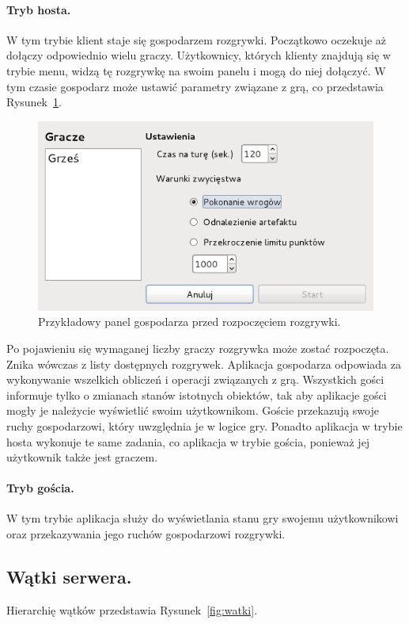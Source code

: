 \documentclass[a4paper, 12pt]{article}
\begin{document}
\paragraph{Tryb hosta.} W tym trybie klient staje się gospodarzem rozgrywki. Początkowo oczekuje aż dołączy odpowiednio wielu graczy. Użytkownicy, których klienty znajdują się w trybie menu, widzą tę rozgrywkę na swoim panelu i mogą do niej dołączyć. W tym czasie gospodarz może ustawić parametry związane z grą, co przedstawia Rysunek~\ref{fig:inicjacja}.

\begin{figure}
\centering
\includegraphics[scale=0.8]{rysunki/inicjacja.png}
\caption{Przykładowy panel gospodarza przed rozpoczęciem rozgrywki.}
\label{fig:inicjacja}
\end{figure}

Po pojawieniu się wymaganej liczby graczy rozgrywka może zostać rozpoczęta. Znika wówczas z listy dostępnych rozgrywek. Aplikacja gospodarza odpowiada za wykonywanie wszelkich obliczeń i operacji związanych z grą. Wszystkich gości informuje tylko o zmianach stanów istotnych obiektów, tak aby aplikacje gości mogły je należycie wyświetlić swoim użytkownikom. Goście przekazują swoje ruchy gospodarzowi, który uwzględnia je w logice gry. Ponadto aplikacja w trybie hosta wykonuje te same zadania, co aplikacja w trybie gościa, ponieważ jej użytkownik także jest graczem.

\paragraph{Tryb gościa.} W tym trybie aplikacja służy do wyświetlania stanu gry swojemu użytkownikowi oraz przekazywania jego ruchów gospodarzowi rozgrywki.

\subsection{Wątki serwera.}
Hierarchię wątków przedstawia Rysunek~\ref{fig:watki}.
\end{document}

